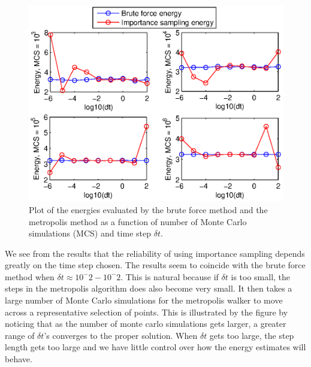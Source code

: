 \begin{figure}[h!]
	\centering 
	\includegraphics[width=\textwidth]{results/importance_sampling.eps}
	\caption{Plot of the energies evaluated by the brute force method and the metropolis method as a function of number of Monte Carlo simulations (MCS) and time step $\delta t$.}
	\label{fig:importance_sampling}
\end{figure}

We see from the results that the reliability of using importance sampling depends greatly on the time step chosen. 
The results seem to coincide with the brute force method when $\delta t \approx 10^-2 - 10^-2$.
This is natural because if $\delta t$ is too small, the steps in the metropolis algorithm does also become very small. 
It then takes a large number of Monte Carlo simulations for the metropolis walker to move across a representative  selection of points. 
This is illustrated by the figure by noticing that as the number of monte carlo simulations gets larger, a greater range of $\delta t$'s converges to the proper solution. 
When $\delta t$ gets too large, the step length gets too large and we have little control over how the energy estimates will behave. 

